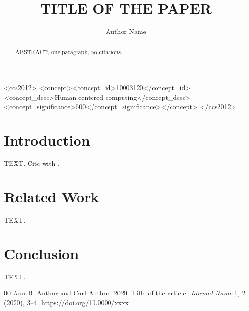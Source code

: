 \documentclass[sigconf,anonymous,review]{acmart}
\begin{document}
\title{TITLE OF THE PAPER}

\author{Author Name}

\begin{abstract}
ABSTRACT, one paragraph, no citations.
\end{abstract}

\begin{CCSXML}
<ccs2012>
<concept><concept_id>10003120</concept_id><concept_desc>Human-centered computing</concept_desc><concept_significance>500</concept_significance></concept>
</ccs2012>
\end{CCSXML}


\maketitle

\section{Introduction}
TEXT. Cite with \cite{key1}.

\section{Related Work}
TEXT.

\section{Conclusion}
TEXT.


\begin{thebibliography}{00}
 Ann B. Author and Carl Author. 2020. Title of the article. \emph{Journal Name} 1, 2 (2020), 3--4. \url{https://doi.org/10.0000/xxxx}
\end{thebibliography}
\end{document}
